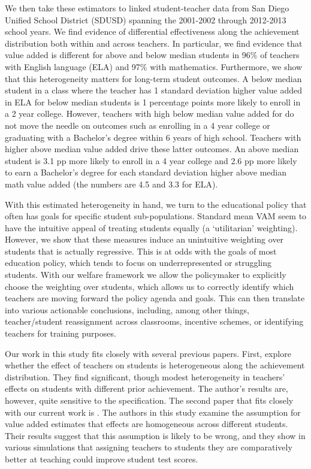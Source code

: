 \documentclass[letterpaper,12pt]{article}
\begin{document}
We then take these estimators to linked student-teacher data from San Diego Unified School District (SDUSD) spanning the 2001-2002 through 2012-2013 school years. We find evidence of differential effectiveness along the achievement distribution both within and across teachers. In particular, we find evidence that value added is different for above and below median students in 96\% of teachers with English language (ELA) and 97\% with mathematics. Furthermore, we show that this heterogeneity matters for long-term student outcomes. A below median student in a class where the teacher has 1 standard deviation higher value added in ELA for below median students is 1 percentage points more likely to enroll in a 2 year college. However, teachers with high below median value added for do not move the needle on outcomes such as enrolling in a 4 year college or graduating with a Bachelor's degree within 6 years of high school. Teachers with higher above median value added drive these latter outcomes. An above median student is 3.1 pp more likely to enroll in a 4 year college and 2.6 pp more likely to earn a Bachelor's degree for each standard deviation higher above median math value added (the numbers are 4.5 and 3.3 for ELA).

With this estimated heterogeneity in hand, we turn to the educational policy that often has goals for specific student sub-populations. Standard mean VAM seem to have the intuitive appeal of treating students equally (a `utilitarian' weighting). However, we show that these measures induce an unintuitive weighting over students that is actually regressive. This is at odds with the goals of most education policy, which tends to focus on underrepresented or struggling students. With our welfare framework we allow the policymaker to explicitly choose the weighting over students, which allows us to correctly identify which teachers are moving forward the policy agenda and goals. This can then translate into various actionable conclusions, including, among other things, teacher/student reassignment across classrooms, incentive schemes, or identifying teachers for training purposes.

Our work in this study fits closely with several previous papers. First, \citet{lockwood2009} explore whether the effect of teachers on students is heterogeneous along the achievement distribution. They find significant, though modest heterogeneity in teachers' effects on students with different prior achievement. The author's results are, however, quite sensitive to the specification. The second paper that fits closely with our current work is \citet{condie2014teacher}. The authors in this study examine the assumption for value added estimates that effects are homogeneous across different students. Their results suggest that this assumption is likely to be wrong, and they show in various simulations that assigning teachers to students they are comparatively better at teaching could improve student test scores.
\end{document}
